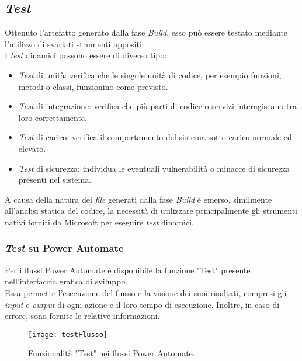 \subsection{\emph{Test}}
Ottenuto l'artefatto generato dalla fase \emph{Build}, esso può essere testato mediante l'utilizzo di svariati strumenti appositi.\\
I \emph{test} dinamici possono essere di diverso tipo: 
\begin{itemize}
    \item \emph{Test} di unità: verifica che le singole unità di codice, per esempio funzioni, metodi o classi, funzionino come previsto.
    \item \emph{Test} di integrazione: verifica che più parti di codice o servizi interagiscano tra loro correttamente.
    \item \emph{Test} di carico: verifica il comportamento del sistema sotto carico normale ed elevato.
    \item \emph{Test} di sicurezza: individua le eventuali vulnerabilità o minacce di sicurezza presenti nel sistema. 
\end{itemize}

A causa della natura dei \emph{file} generati dalla fase \emph{Build} è emerso, similmente all'analisi statica del codice, la necessità di utilizzare principalmente gli strumenti nativi forniti da Microsoft per eseguire \emph{test} dinamici.\\

\subsubsection*{\emph{Test} su Power Automate}
Per i flussi Power Automate è disponibile la funzione "Test" presente nell'interfaccia grafica di sviluppo.\\
Essa permette l'esecuzione del flusso e la visione dei suoi risultati, compresi gli \emph{input} e \emph{output} di ogni azione e il loro tempo di esecuzione. 
Inoltre, in caso di errore, sono fornite le relative informazioni. 
\begin{figure}[htbp] 
    \centering 
    \texttt{[image: testFlusso]} 
    \caption{Funzionalità "Test" nei flussi Power Automate.}
    \label{fig:testFlusso}
\end{figure}

